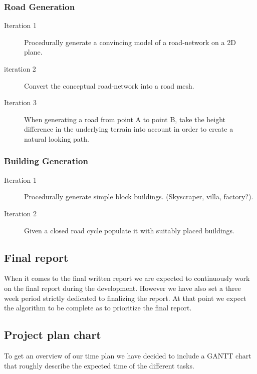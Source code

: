 \subsubsection{Road Generation}
\begin{description}
  \item[Iteration 1] Procedurally generate a convincing model of a road-network on a 2D plane.
  \item[iteration 2] Convert the conceptual road-network into a road mesh. %
  \item[Iteration 3] When generating a road from point A to point B, take the height difference in the underlying terrain into account in order to create a natural looking path.
\end{description}

\subsubsection{Building Generation}
\begin{description}
  \item[Iteration 1] Procedurally generate simple block buildings. (Skyscraper, villa, factory?).
  \item[Iteration 2] Given a closed road cycle populate it with suitably placed buildings.
\end{description}


\subsection{Final report}
When it comes to the final written report we are expected to continuously work on the final report during the development.
However we have also set a three week period strictly dedicated to finalizing the report.
At that point we expect the algorithm to be complete as to prioritize the final report.

\subsection{Project plan chart}
To get an overview of our time plan we have decided to include a GANTT chart that roughly describe the expected time of the different tasks.



